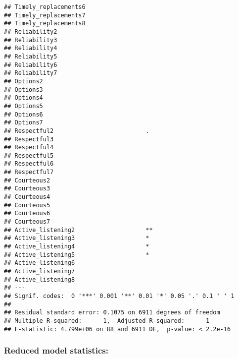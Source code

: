 \documentclass[
]{article}
\begin{document}
\begin{verbatim}
## Timely_replacements6                    
## Timely_replacements7                    
## Timely_replacements8                    
## Reliability2                            
## Reliability3                            
## Reliability4                            
## Reliability5                            
## Reliability6                            
## Reliability7                            
## Options2                                
## Options3                                
## Options4                                
## Options5                                
## Options6                                
## Options7                                
## Respectful2                          .  
## Respectful3                             
## Respectful4                             
## Respectful5                             
## Respectful6                             
## Respectful7                             
## Courteous2                              
## Courteous3                              
## Courteous4                              
## Courteous5                              
## Courteous6                              
## Courteous7                              
## Active_listening2                    ** 
## Active_listening3                    *  
## Active_listening4                    *  
## Active_listening5                    *  
## Active_listening6                       
## Active_listening7                       
## Active_listening8                       
## ---
## Signif. codes:  0 '***' 0.001 '**' 0.01 '*' 0.05 '.' 0.1 ' ' 1
## 
## Residual standard error: 0.1075 on 6911 degrees of freedom
## Multiple R-squared:      1,  Adjusted R-squared:      1 
## F-statistic: 4.799e+06 on 88 and 6911 DF,  p-value: < 2.2e-16
\end{verbatim}

\subsubsection{Reduced model
statistics:}\label{reduced-model-statistics}
\end{document}
